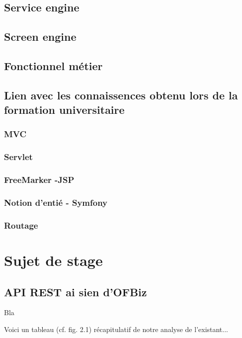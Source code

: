\subsection{Service engine}
\subsection{Screen engine}
\subsection{Fonctionnel métier}
\subsection{Lien avec les connaissences obtenu lors de la formation universitaire}
\subsubsection{MVC}
\subsubsection{Servlet}
\subsubsection{FreeMarker -JSP}
\subsubsection{Notion d'entié - Symfony}
\subsubsection{Routage}

\section{Sujet de stage }



\subsection{API REST ai sien d'OFBiz}

Bla


Voici un tableau (cf. fig. 2.1) récapitulatif de notre analyse de l'existant...\\


